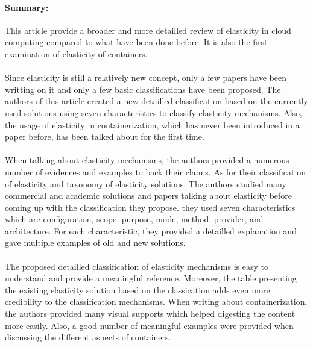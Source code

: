 \documentclass[11pt]{article}
\begin{document}
\paragraph{Summary:} {This article provide a broader and more detailled review of elasticity in cloud computing compared to what have been done before. It is also the first examination of elasticity of containers.} 
\\
\\
{Since elasticity is still a relatively new concept, only a few papers have been writting on it and only a few basic classifications have been proposed. The authors of this article created a new detailled classification based on the currently used solutions using seven characteristics to classify elasticity mechanisms. Also, the usage of elasticity in containerization, which has never been introduced in a paper before, has been talked about for the first time. }
\\
\\
{When talking about elasticity mechanisms, the authors provided a numerous number of evidences and examples to back their claims. As for their classification of elasticity and taxonomy of elasticity solutions, The authors studied many commercial and academic solutions and papers talking about elasticity before coming up with the classification they propose. they used seven characteristics which are configuration, scope, purpose, mode, method, provider, and architecture. For each characteristic, they provided a detailled explanation and gave multiple examples of old and new solutions. }
\\
\\
{The proposed detailled classification of elasticity mechanisms is easy to understand and provide a meaningful reference. Moreover, the table presenting the existing elasticity solution based on the classication adds even more credibility to the classification mechanisms. When writing about containerization, the authors provided many visual supports which helped digesting the content more easily. Also, a good number of meaningful examples were provided when discussing the different aspects of containers.}

~\newline
\end{document}
